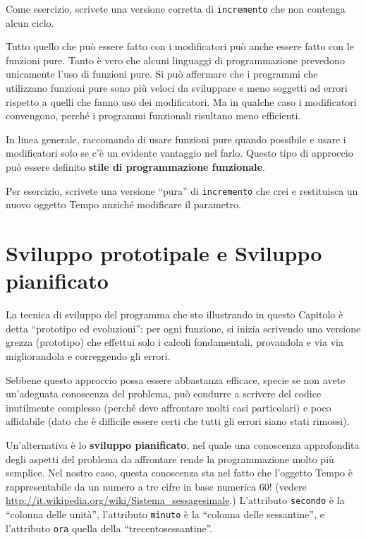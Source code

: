 \documentclass[10pt]{book}
\begin{document}
Come esercizio, scrivete una versione corretta di {\tt incremento} che non contenga alcun ciclo.

Tutto quello che può essere fatto con i modificatori può anche essere fatto con le funzioni pure. Tanto è vero che alcuni linguaggi di programmazione prevedono unicamente l'uso di funzioni pure. Si può affermare che i programmi che utilizzano funzioni pure sono più veloci da sviluppare e meno soggetti ad errori rispetto a quelli che fanno uso dei modificatori. Ma in qualche caso i modificatori convengono, perché i programmi funzionali risultano meno efficienti.

In linea generale, raccomando di usare funzioni pure quando possibile e usare i modificatori solo se c'è un evidente vantaggio nel farlo. Questo tipo di approccio può essere definito {\bf stile di programmazione funzionale}.

Per esercizio, scrivete una versione ``pura'' di {\tt incremento} che crei e restituisca un nuovo oggetto Tempo anziché modificare il parametro.


\section{Sviluppo prototipale e Sviluppo pianificato}
\label{prototype}

La tecnica di sviluppo del programma che sto illustrando in questo Capitolo è detta ``prototipo ed evoluzioni'': per ogni funzione, si inizia scrivendo una versione grezza (prototipo) che effettui solo i calcoli fondamentali, provandola e via via migliorandola e correggendo gli errori.

Sebbene questo approccio possa essere abbastanza efficace, specie se non avete un'adeguata conoscenza del problema, può condurre a scrivere del codice inutilmente complesso (perché deve affrontare molti casi particolari) e poco affidabile (dato che è difficile essere certi che tutti gli errori siano stati rimossi).

Un'alternativa è lo {\bf sviluppo pianificato}, nel quale una conoscenza approfondita degli aspetti del problema da affrontare rende la programmazione molto più semplice. Nel nostro caso, questa conoscenza sta nel fatto che l'oggetto Tempo è rappresentabile da un numero a tre cifre in base numerica 60! (vedere \url{http://it.wikipedia.org/wiki/Sistema_sessagesimale}.)  L'attributo
{\tt secondo} è la ``colonna delle unità'', l'attributo {\tt minuto}
è la ``colonna delle sessantine'', e l'attributo {\tt ora} quella della ``trecentosessantine''.
\end{document}
